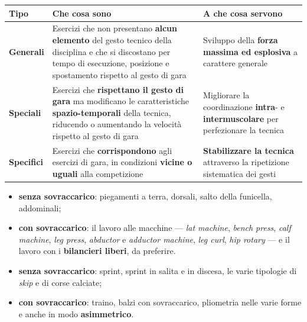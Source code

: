 \begin{table}[htbp]
  \centering
  \small
  \renewcommand{\arraystretch}{1.3}
  \begin{tabularx}{\textwidth}{|l|X|X|}
    \hline
    \textbf{Tipo} & \textbf{Che cosa sono} & \textbf{A che cosa servono} \\
    \hline
    \textbf{Generali} & Esercizi che non presentano \textbf{alcun elemento} del gesto tecnico della
      disciplina e che si discostano per tempo di esecuzione, posizione e spostamento rispetto al
      gesto di gara & Sviluppo della \textbf{forza massima ed esplosiva} a carattere generale \\
    \hline
    \textbf{Speciali} & Esercizi che \textbf{rispettano il gesto di gara} ma modificano le
      caratteristiche \textbf{spazio-temporali} della tecnica, riducendo o aumentando la velocità
      rispetto al gesto di gara & Migliorare la coordinazione \textbf{intra}- e
      \textbf{intermuscolare} per perfezionare la tecnica \\
    \hline
    \textbf{Specifici} & Esercizi che \textbf{corrispondono} agli esercizi di gara, in condizioni
      \textbf{vicine o uguali} alla competizione & \textbf{Stabilizzare la tecnica} attraverso la
      ripetizione sistematica dei gesti \\
    \hline
  \end{tabularx}
\end{table}

\begin{itemize}
  \item \textbf{senza sovraccarico}: piegamenti a terra, dorsali, salto della funicella, addominali;
  \item \textbf{con sovraccarico}: il lavoro alle macchine --- \textit{lat machine},
    \textit{bench press}, \textit{calf machine}, \textit{leg press}, \textit{abductor} e
    \textit{adductor machine}, \textit{leg curl}, \textit{hip rotary} --- e il lavoro con i
    \textbf{bilancieri liberi}, da preferire.
\end{itemize}

\begin{itemize}
  \item \textbf{senza sovraccarico}: sprint, sprint in salita e in discesa, le varie tipologie di
    \textit{skip} e di corse calciate;
  \item \textbf{con sovraccarico}: traino, balzi con sovraccarico, pliometria nelle varie forme e
    anche in modo \textbf{asimmetrico}.
\end{itemize}

